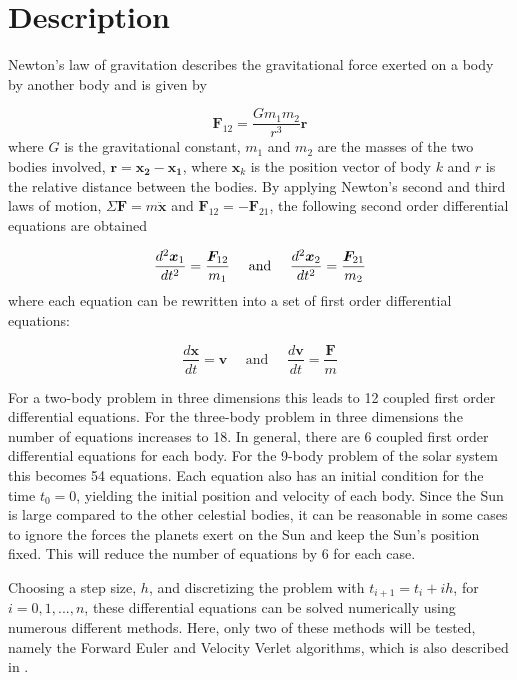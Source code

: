 \documentclass{article}
\begin{document}
\section{Description}
\label{sec:description}
Newton's law of gravitation describes the gravitational force exerted on a body by another body and is given by

\begin{equation}
\bm{F}_{12} = \frac{Gm_1m_2}{r^3}\bm{r}
\end{equation}
where $G$ is the gravitational constant, $m_1$ and $m_2$ are the masses of the two bodies involved, $\bm{r} = \bm{x_2} - \bm{x_1}$, where $\bm{x}_k$ is the position vector of body $k$ and $r$ is the relative distance between the bodies. By applying Newton's second and third laws of motion, $\Sigma\bm{F} = m\bm{\ddot x}$ and $\bm{F}_{12}=-\bm{F}_{21}$, the following second order differential equations are obtained

\begin{equation}
\frac{d^2\bm{x}_1}{dt^2} = \frac{\bm{F_}{12}}{m_1} \quad \text{ and } \quad \frac{d^2\bm{x}_2}{dt^2} = \frac{\bm{F}_{21}}{m_2}
\end{equation}
where each equation can be rewritten into a set of first order differential equations:

\begin{equation}
\frac{d\bm{x}}{dt} = \bm{v} \quad \text{ and } \quad \frac{d\bm{v}}{dt} = \frac{\bm{F}}{m}
\end{equation}

For a two-body problem in three dimensions this leads to 12 coupled first order differential equations. For the three-body problem in three dimensions the number of equations increases to 18. In general, there are 6 coupled first order differential equations for each body. For the 9-body problem of the solar system this becomes 54 equations. Each equation also has an initial condition for the time $t_0=0$, yielding the initial position and velocity of each body. Since the Sun is large compared to the other celestial bodies, it can be reasonable in some cases to ignore the forces the planets exert on the Sun and keep the Sun's position fixed. This will reduce the number of equations by 6 for each case.

Choosing a step size, $h$, and discretizing the problem with $t_{i+1} = t_i + ih$, for $i=0,1,...,n$, these differential equations can be solved numerically using numerous different methods. Here, only two of these methods will be tested, namely the Forward Euler and Velocity Verlet algorithms, which is also described in \cite{lectures}.
\end{document}

